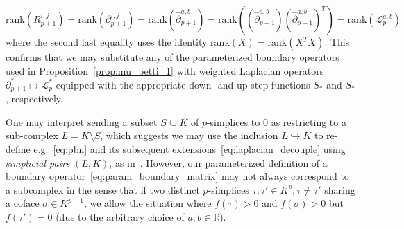 \begin{equation}
	\mathrm{rank}(R_{p+1}^{i,j}) = \mathrm{rank}(\partial_{p+1}^{i, j}) = \mathrm{rank}(\hat{\partial}_{p+1}^{a,b}) = \mathrm{rank}\left((\hat{\partial}_{p+1}^{a,b})(\hat{\partial}_{p+1}^{a,b})^T \right) = \mathrm{rank}(\mathcal{L}_{p}^{a,b})
\end{equation}
where the second last equality uses the identity $\mathrm{rank}(X) = \mathrm{rank}(X^T X)$. This confirms that we may substitute any of the parameterized boundary operators used in Proposition~\ref{prop:mu_betti_1}  with weighted Laplacian operators $\partial_{p+1}^\ast \mapsto \mathcal{L}_p^\ast$ equipped with the appropriate down- and up-step functions $S_\ast$ and $\bar{S}_\ast$, respectively.   


\begin{remark}
One may interpret sending a subset $S \subseteq K$ of $p$-simplices to $0$ as restricting to a sub-complex $L = K \setminus S$, which suggests we may use the inclusion $L \hookrightarrow K$ to re-define e.g.~\eqref{eq:pbn} and its subsequent extensions~\eqref{eq:laplacian_decouple} using \emph{simplicial pairs} $(L, K)$, as in~\cite{memoli2022persistent}. However, our parameterized definition of a boundary operator~\eqref{eq:param_boundary_matrix} may not always correspond to a subcomplex in the sense that if two distinct $p$-simplices $\tau, \tau' \in K^p, \tau \neq \tau'$ sharing a coface $\sigma \in K^{p+1}$, we allow the situation where $f(\tau) > 0$ and $f(\sigma) > 0$ but $f(\tau') = 0$ (due to the arbitrary choice of $a, b \in \mathbb{R}$). 
\end{remark}

